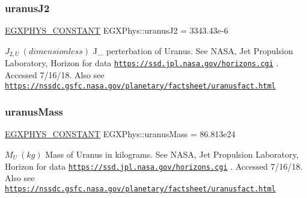 \subsubsection{\texorpdfstring{uranus\+J2}{uranusJ2}}
{\footnotesize\ttfamily \mbox{\hyperlink{group___e_g_x_phys-_constants-_macros_ga76980d288494ce1714c9ac68a95ba702}{E\+G\+X\+P\+H\+Y\+S\+\_\+\+C\+O\+N\+S\+T\+A\+NT}} E\+G\+X\+Phys\+::uranus\+J2 = 3343.\+43e-\/6}

$ J_{2,U} \ (dimensionless)$ J\+\_ perterbation of Uranus. See N\+A\+SA, Jet Propulsion Laboratory, Horizon for data \href{https://ssd.jpl.nasa.gov/horizons.cgi}{\tt https\+://ssd.\+jpl.\+nasa.\+gov/horizons.\+cgi} . Accessed 7/16/18. Also see \href{https://nssdc.gsfc.nasa.gov/planetary/factsheet/uranusfact.html}{\tt https\+://nssdc.\+gsfc.\+nasa.\+gov/planetary/factsheet/uranusfact.\+html} \mbox{\label{group___e_g_x_phys-_constants-_astrophysics-_solar_system-_uranus-_bulk_gaccabd738d57e4f5b6dc7b88d67b2cace}} 
\subsubsection{\texorpdfstring{uranus\+Mass}{uranusMass}}
{\footnotesize\ttfamily \mbox{\hyperlink{group___e_g_x_phys-_constants-_macros_ga76980d288494ce1714c9ac68a95ba702}{E\+G\+X\+P\+H\+Y\+S\+\_\+\+C\+O\+N\+S\+T\+A\+NT}} E\+G\+X\+Phys\+::uranus\+Mass = 86.\+813e24}

$M_{U} \ (kg)$ Mass of Uranus in kilograms. See N\+A\+SA, Jet Propulsion Laboratory, Horizon for data \href{https://ssd.jpl.nasa.gov/horizons.cgi}{\tt https\+://ssd.\+jpl.\+nasa.\+gov/horizons.\+cgi} . Accessed 7/16/18. Also see \href{https://nssdc.gsfc.nasa.gov/planetary/factsheet/uranusfact.html}{\tt https\+://nssdc.\+gsfc.\+nasa.\+gov/planetary/factsheet/uranusfact.\+html} \mbox{\label{group___e_g_x_phys-_constants-_astrophysics-_solar_system-_uranus-_bulk_ga26cda1990ca0ac98e925a80c26ee88f5}} 
